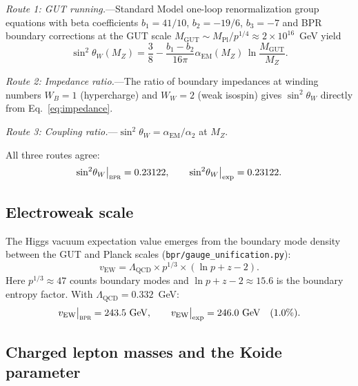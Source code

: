 \documentclass[aps,prd,twocolumn,superscriptaddress,longbibliography,nofootinbib]{revtex4-2}
\newcommand{\vEW}{v_{\mathrm{EW}}}
\newcommand{\sinW}{\sin^2\!\theta_W}
\newcommand{\alphaEM}{\alpha_{\mathrm{EM}}}
\newcommand{\LQCD}{\Lambda_{\mathrm{QCD}}}
\newcommand{\MPl}{M_{\mathrm{Pl}}}
\newcommand{\MGUT}{M_{\mathrm{GUT}}}
\newcommand{\MZ}{M_Z}
\newcommand{\bpr}{\textsc{bpr}}
\begin{document}
\textit{Route 1: GUT running.}---Standard Model one-loop
renormalization group equations with beta coefficients
$b_1 = 41/10$, $b_2 = -19/6$, $b_3 = -7$ and BPR boundary
corrections at the GUT scale $\MGUT \sim \MPl / p^{1/4} \approx
2 \times 10^{16}$~GeV yield
\begin{equation}
\sinW(\MZ) = \frac{3}{8} - \frac{b_1 - b_2}{16\pi}
  \alphaEM(\MZ)\, \ln\frac{\MGUT}{\MZ}.
\label{eq:weinberg_running}
\end{equation}

\textit{Route 2: Impedance ratio.}---The ratio of boundary
impedances at winding numbers $W_B = 1$ (hypercharge) and $W_W = 2$
(weak isospin) gives $\sinW$ directly from
Eq.~\eqref{eq:impedance}.

\textit{Route 3: Coupling ratio.}---$\sinW =
\alphaEM / \alpha_2$ at $\MZ$.

All three routes agree:
\begin{equation}
\sinW\big|_{\bpr} = 0.23122, \qquad
\sinW\big|_{\mathrm{exp}} = 0.23122.
\label{eq:weinberg_value}
\end{equation}

\subsection{Electroweak scale}

The Higgs vacuum expectation value emerges from the boundary mode
density between the GUT and Planck scales
(\texttt{bpr/gauge\_unification.py}):
\begin{equation}
\vEW = \LQCD \times p^{1/3} \times (\ln p + z - 2).
\label{eq:vew}
\end{equation}
Here $p^{1/3} \approx 47$ counts boundary modes and
$\ln p + z - 2 \approx 15.6$ is the boundary entropy factor.  With
$\LQCD = 0.332$~GeV:
\begin{equation}
\vEW\big|_{\bpr} = 243.5~\text{GeV}, \qquad
\vEW\big|_{\mathrm{exp}} = 246.0~\text{GeV} \quad (1.0\%).
\label{eq:vew_value}
\end{equation}

\subsection{Charged lepton masses and the Koide parameter}
\end{document}
